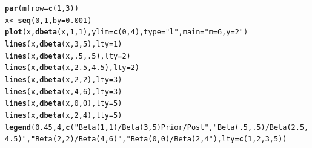 \documentclass[12pt]{article}\usepackage[]{graphicx}\usepackage[]{color}
\makeatletter
\newcommand{\hlnum}[1]{\textcolor[rgb]{0.686,0.059,0.569}{#1}}%
\newcommand{\hlstr}[1]{\textcolor[rgb]{0.192,0.494,0.8}{#1}}%
\newcommand{\hlstd}[1]{\textcolor[rgb]{0.345,0.345,0.345}{#1}}%
\newcommand{\hlkwb}[1]{\textcolor[rgb]{0.69,0.353,0.396}{#1}}%
\newcommand{\hlkwc}[1]{\textcolor[rgb]{0.333,0.667,0.333}{#1}}%
\newcommand{\hlkwd}[1]{\textcolor[rgb]{0.737,0.353,0.396}{\textbf{#1}}}%
\newenvironment{kframe}{%
 \def\at@end@of@kframe{}%
 \ifinner\ifhmode%
  \def\at@end@of@kframe{\end{minipage}}%
  \begin{minipage}{\columnwidth}%
 \fi\fi%
 \def\FrameCommand##1{\hskip\@totalleftmargin \hskip-\fboxsep
 \colorbox{shadecolor}{##1}\hskip-\fboxsep
     \hskip-\linewidth \hskip-\@totalleftmargin \hskip\columnwidth}%
 \MakeFramed {\advance\hsize-\width
   \@totalleftmargin\z@ \linewidth\hsize
   \@setminipage}}%
 {\par\unskip\endMakeFramed%
 \at@end@of@kframe}
\newenvironment{knitrout}{}{} %
\makeatother
\begin{document}
\begin{knitrout}\footnotesize
{}\color{fgcolor}\begin{kframe}
\begin{alltt}
\hlkwd{par}\hlstd{(}\hlkwc{mfrow}\hlstd{=}\hlkwd{c}\hlstd{(}\hlnum{1}\hlstd{,}\hlnum{3}\hlstd{))}
\hlstd{x} \hlkwb{<-} \hlkwd{seq}\hlstd{(}\hlnum{0}\hlstd{,}\hlnum{1}\hlstd{,}\hlkwc{by}\hlstd{=}\hlnum{0.001}\hlstd{)}
\hlkwd{plot}\hlstd{(x,} \hlkwd{dbeta}\hlstd{(x,} \hlnum{1}\hlstd{,}\hlnum{1}\hlstd{),} \hlkwc{ylim}\hlstd{=}\hlkwd{c}\hlstd{(}\hlnum{0}\hlstd{,}\hlnum{4}\hlstd{),} \hlkwc{type}\hlstd{=}\hlstr{"l"}\hlstd{,} \hlkwc{main}\hlstd{=}\hlstr{"m=6, y=2"}\hlstd{)}
\hlkwd{lines}\hlstd{(x,} \hlkwd{dbeta}\hlstd{(x,} \hlnum{3}\hlstd{,}\hlnum{5}\hlstd{),} \hlkwc{lty}\hlstd{=}\hlnum{1}\hlstd{)}
\hlkwd{lines}\hlstd{(x,} \hlkwd{dbeta}\hlstd{(x,} \hlnum{.5}\hlstd{,}\hlnum{.5}\hlstd{),} \hlkwc{lty}\hlstd{=}\hlnum{2}\hlstd{)}
\hlkwd{lines}\hlstd{(x,} \hlkwd{dbeta}\hlstd{(x,} \hlnum{2.5}\hlstd{,} \hlnum{4.5}\hlstd{),} \hlkwc{lty}\hlstd{=}\hlnum{2}\hlstd{)}
\hlkwd{lines}\hlstd{(x,} \hlkwd{dbeta}\hlstd{(x,} \hlnum{2}\hlstd{,}\hlnum{2}\hlstd{),} \hlkwc{lty}\hlstd{=}\hlnum{3}\hlstd{)}
\hlkwd{lines}\hlstd{(x,} \hlkwd{dbeta}\hlstd{(x,} \hlnum{4}\hlstd{,} \hlnum{6}\hlstd{),} \hlkwc{lty}\hlstd{=}\hlnum{3}\hlstd{)}
\hlkwd{lines}\hlstd{(x,} \hlkwd{dbeta}\hlstd{(x,} \hlnum{0}\hlstd{,}\hlnum{0}\hlstd{),} \hlkwc{lty}\hlstd{=}\hlnum{5}\hlstd{)}
\hlkwd{lines}\hlstd{(x,} \hlkwd{dbeta}\hlstd{(x,} \hlnum{2}\hlstd{,} \hlnum{4}\hlstd{),} \hlkwc{lty}\hlstd{=}\hlnum{5}\hlstd{)}
\hlkwd{legend}\hlstd{(}\hlnum{0.45}\hlstd{,}\hlnum{4}\hlstd{,} \hlkwd{c}\hlstd{(}\hlstr{"Beta(1,1)/Beta(3,5) Prior/Post"}\hlstd{,} \hlstr{"Beta(.5,.5)/Beta(2.5,4.5)"}\hlstd{,} \hlstr{"Beta(2,2)/Beta(4,6)"}\hlstd{,} \hlstr{"Beta(0,0)/Beta(2,4"}\hlstd{),} \hlkwc{lty}\hlstd{=}\hlkwd{c}\hlstd{(}\hlnum{1}\hlstd{,}\hlnum{2}\hlstd{,}\hlnum{3}\hlstd{,}\hlnum{5}\hlstd{))}


\end{alltt}
\end{kframe}
\end{knitrout}
\end{document}
